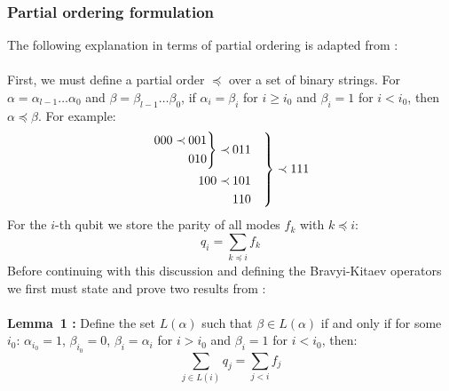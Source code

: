 \documentclass[twoside]{article}
\begin{document}
\subsubsection{Partial ordering formulation}\label{partialorderingsec}
The following explanation in terms of partial ordering is adapted from \cite{bravyikitaev}: \\\\First, we must define a partial order $\preceq$ over a set of binary strings. For $\alpha = \alpha_{l-1}\ldots \alpha_0$ and $\beta = \beta_{l-1}\ldots \beta_0$, if $\alpha_i = \beta_i$ for $i\geq i_0$ and $\beta_i = 1$ for $i < i_0$, then $\alpha \preceq \beta$. For example:
$$
\begin{rcases}
        \begin{aligned}
        \begin{rcases}
                \begin{aligned}
                        000 \prec \>&001 \\
                                  &010
               \end{aligned}
       \end{rcases} \prec \>&011 \\
        100 \prec \>&101\\
                  &110
        \end{aligned}
\end{rcases}
\prec 111
$$
For the $i$-th qubit we store the parity of all modes $f_k$ with $k \preceq i$:
\begin{equation}
        q_i = \sum_{k \preceq i} f_k \label{paritystore}
\end{equation}
Before continuing with this discussion and defining the Bravyi-Kitaev operators we first must state and prove two results from \cite{bravyikitaev}:\\\\
{\bf Lemma~1 \cite{bravyikitaev}:} Define the set $L(\alpha)$ such that $\beta \in L(\alpha)$ if and only if for some $i_0$: $\alpha_{i_0} = 1$, $\beta_{i_0} = 0$, $\beta_i = \alpha_i$ for $i> i_0$ and $\beta_i = 1$ for $i< i_0$, then:
\begin{equation}
        \sum_{j \in L(i)} q_j = \sum_{j < i} f_j
\end{equation}
\vspace*{12pt}
\end{document}
